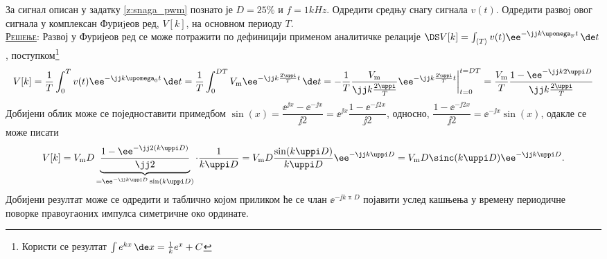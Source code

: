 \PID 
За сигнал описан у задатку \ref{z:snaga_pwm} познато је 
$D = 25\%$ и $f = 1\unit{kHz}$. Одредити средњу снагу сигнала $v(t)$.
Одредити развоj овог сигнала у комплексан Фуриjеов ред, $V[k]$, на основном периоду $T$.
\\[2mm]

\textsc{\underline{Решење}}: Развој у Фуријеов ред се може потражити по дефиницији применом 
аналитичке релације 
$\DS V[k] = \int_{\langle T \rangle} v(t) \ee^{-\jj k \upomega_{\rm F} t} \, \de t$, 
поступком\footnote{Користи се резултат $\int e^{kx} \, \de x = \frac{1}{k} e^x + C$}
\begin{align}
    V[k] = \dfrac{1}{T} \int_{0}^T v(t) \ee^{-\jj k \upomega_{\rm 0} t} \, \de t 
         = \dfrac{1}{T} \int_{0}^{DT}  V_{\rm m} \ee^{-\jj k \frac{2\uppi}{T} t} \, \de t
         = - \dfrac{1}{T} \dfrac{V_{\rm m}}{\jj k \frac{2\uppi}{T}} 
         \ee^{-\jj k \frac{2\uppi}{T} t}\bigg|_{t = 0}^{t = DT}
         = \dfrac{V_{\rm m}}{T} \dfrac{
            1
            -
            \ee^{-\jj k 2\uppi D}
         }{\jj k \frac{2\uppi}{T}} 
\end{align}
Добијени облик може се поједноставити примедбом 
$\sin(x) = \dfrac{\ee^{\jj x} - \ee^{-\jj x}}{\jj 2} = \ee^{\jj x} \dfrac{1 - \ee^{-\jj 2x}}{\jj 2}$,
односно, 
$\dfrac{1 - \ee^{-\jj 2x}}{\jj 2} = \ee^{-\jj x} \sin(x) $,
одакле се може писати
\begin{align}
    V[k] = V_{\rm m}D 
     \underbrace{
     \dfrac{
        1
        -
        \ee^{-\jj 2 (k \uppi D) }
     }{\jj 2 }}_{ = \ee^{-\jj k \uppi D} \sin(k\uppi D) }
     \cdot 
     \dfrac{1}{k \uppi D} 
     = V_{\rm m} D \dfrac{\sin(k\uppi D)}{k\uppi D} \ee^{-\jj k \uppi D} 
     = V_{\rm m} D \sinc(k \uppi D) \ee^{-\jj k \uppi D}.
\end{align}
Добијени резултат може се одредити и таблично којом приликом ће се члан 
$\ee^{-\jj k \uppi D}$ појавити услед кашњења у времену периодичне поворке правоугаоних 
импулса симетричне око ординате. 
